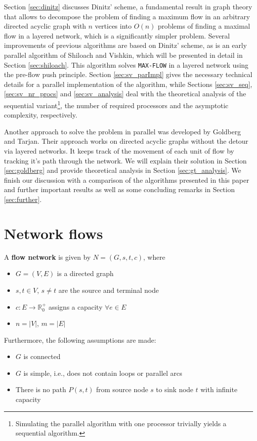 \documentclass[a4paper,10pt, twocolumn]{article}
\begin{document}
Section \ref{sec:dinitz} discusses Dinitz' scheme, a fundamental result in graph theory that allows to  decompose the problem of finding a maximum flow in an arbitrary directed acyclic graph with $n$ vertices into $O(n)$ problems of finding a maximal flow in a layered network, which is a significantly simpler problem. Several improvements of previous algorithms are based on Dinitz' scheme, as is an early parallel algorithm of Shiloach and Vishkin, which will be presented in detail in  Section \ref{sec:shiloach}. This algorithm solves \lstinline|MAX-FLOW| in a layered network using the pre-flow push principle. Section \ref{sec:sv_parImpl} gives the necessary technical details for a parallel implementation of the algorithm, while Sections \ref{sec:sv_seq}, \ref{sec:sv_nr_procs} and \ref{sec:sv_analysis} deal with the theoretical analysis of the sequential variant\footnote{Simulating the parallel algorithm with one processor trivially yields a sequential algorithm.}, the number of required processors and the asymptotic complexity, respectively.

Another approach to solve the problem in parallel was developed by Goldberg and Tarjan. Their approach works on directed acyclic graphs without the detour via layered networks. It keeps track of the movement of each unit of flow by tracking it's path through the network. We will explain their solution in Section \ref{sec:goldberg} and provide theoretical analysis in Section \ref{sec:gt_analysis}. We finish our discussion with a comparison of the algorithms presented in this paper and further important results as well as some concluding remarks in Section \ref{sec:further}. 

\section{Network flows}
\label{sec:networkFlows}
A \textbf{flow network} \cite{ahuja93} is given by $N = (G,s,t,c)$, where
\begin{itemize}
	\item $G =(V,E)$ is a directed graph
    \item $s, t \in V$, $s \neq t$ are the source and terminal node
   	\item $c:E\rightarrow \mathbb{R}_0^{+}$ assigns a capacity $\forall e \in E$
   	\item $n=\lvert V\rvert$, $m=\lvert E\rvert$
\end{itemize}

Furthermore, the following assumptions are made:
\begin{itemize}
	\item $G$ is connected
	\item $G$ is simple, i.e., does not contain loops or parallel arcs
	\item There is no path $P(s,t)$ from source node $s$ to sink node $t$ with infinite capacity
\end{itemize}
\end{document}
